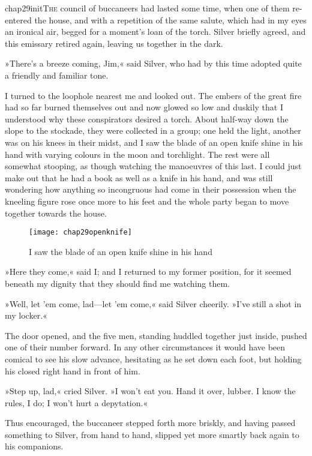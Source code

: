 
\lettrine[lines=5,image=true,findent=2pt]{chap29initT}{he} council of buccaneers had lasted some time, when one of them re-entered the house, and with a repetition of the same salute, which had in my eyes an ironical air, begged for a moment's loan of the torch. Silver briefly agreed, and this emissary retired again, leaving us together in the dark.

»There's a breeze coming, Jim,« said Silver, who had by this time adopted quite a friendly and familiar tone.

I turned to the loophole nearest me and looked out. The embers of the great fire had so far burned themselves out and now glowed so low and duskily that I understood why these conspirators desired a torch. About half-way down the slope to the stockade, they were collected in a group; one held the light, another was on his knees in their midst, and I saw the blade of an open knife shine in his hand with varying colours in the moon and torchlight. The rest were all somewhat stooping, as though watching the manoeuvres of this last. I could just make out that he had a book as well as a knife in his hand, and was still wondering how anything so incongruous had come in their possession when the kneeling figure rose once more to his feet and the whole party began to move together towards the house.

\begin{figure}[p]
\centering
\texttt{[image: chap29openknife]}
\caption{I saw the blade of an open knife shine in his hand}
\end{figure} 

»Here they come,« said I; and I returned to my former position, for it seemed beneath my dignity that they should find me watching them.

»Well, let 'em come, lad—let 'em come,« said Silver cheerily. »I've still a shot in my locker.«

The door opened, and the five men, standing huddled together just inside, pushed one of their number forward. In any other circumstances it would have been comical to see his slow advance, hesitating as he set down each foot, but holding his closed right hand in front of him.

»Step up, lad,« cried Silver. »I won't eat you. Hand it over, lubber. I know the rules, I do; I won't hurt a depytation.«

Thus encouraged, the buccaneer stepped forth more briskly, and having passed something to Silver, from hand to hand, slipped yet more smartly back again to his companions.

